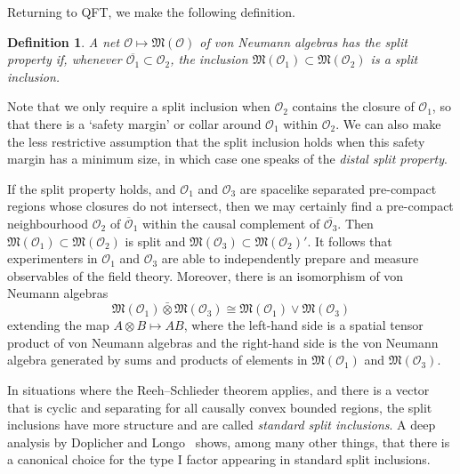 \documentclass[12pt]{article}
\newcommand{\1}{\mathds{1}}                         %
\newcommand{\Ocal}{\mathcal{O}}
\newcommand{\Mf}{{\mathfrak{M}}}
\newtheorem{definition}[theorem]{Definition}
\begin{document}
Returning to QFT, we make the following definition.
\begin{definition}
	A net $\Ocal\mapsto\Mf(\Ocal)$ of von Neumann algebras has the \emph{split property} if, whenever $\overline{\Ocal_1}\subset \Ocal_2$, the inclusion $\Mf(\Ocal_1)\subset \Mf(\Ocal_2)$ is a split inclusion. 
\end{definition}
Note that we only require a split inclusion when $\Ocal_2$ contains the closure of $\Ocal_1$, so that there is a `safety margin' or collar around $\Ocal_1$ within $\Ocal_2$. We can also make the less restrictive assumption that the split inclusion holds when this safety margin has a minimum size, in which case one speaks of the \emph{distal split property}. 

If the split property holds, and $\Ocal_1$ and $ \Ocal_3$ are spacelike separated pre-compact regions whose closures do not intersect, then we may certainly find a pre-compact neighbourhood $\Ocal_2$ of $\overline{\Ocal}_1$ within the causal complement of $\overline{\Ocal_3}$. Then $\Mf(\Ocal_1)\subset \Mf(\Ocal_2)$ is split and $\Mf( \Ocal_3)\subset \Mf(\Ocal_2)'$. It follows that experimenters in $\Ocal_1$ and $ \Ocal_3$ are able to independently prepare and measure observables of the field theory. Moreover, there is an isomorphism of von Neumann algebras
\[
\Mf(\Ocal_1)\bar{\otimes}\Mf( \Ocal_3)\cong \Mf(\Ocal_1)\vee \Mf( \Ocal_3)
\]
extending the map $A\otimes B\mapsto AB$, 
where the left-hand side is a spatial tensor product of von Neumann algebras and the right-hand side is the von Neumann algebra generated by sums and products of elements in $\Mf(\Ocal_1)$ and $\Mf(\Ocal_3)$.

In situations where the Reeh--Schlieder theorem applies, and there is a vector that is cyclic and separating for all causally convex bounded regions, the split inclusions have more structure and are called \emph{standard split inclusions}. A deep analysis by Doplicher and Longo~\cite{DopLon:1984} shows, among many other things, that there is a canonical choice for the type I factor appearing in standard split inclusions. 
\end{document}
